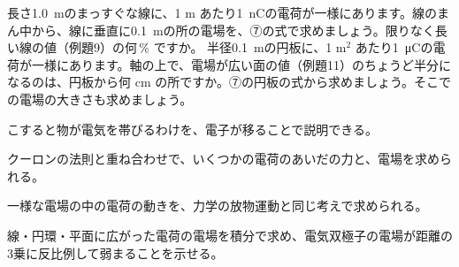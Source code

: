 \bkproblem 長さ\qty{1.0}{m}のまっすぐな線に、1 m あたり\qty{1}{nC}の電荷が一様にあります。線のまん中から、線に垂直に\qty{0.1}{m}の所の電場を、⑦の式で求めましょう。限りなく長い線の値（例題9）の何\,\% ですか。
\bkproblem 半径\qty{0.1}{m}の円板に、1 m$^2$ あたり\qty{1}{\micro C}の電荷が一様にあります。軸の上で、電場が広い面の値（例題11）のちょうど半分になるのは、円板から何 cm の所ですか。⑦の円板の式から求めましょう。そこでの電場の大きさも求めましょう。
\begin{furikaeri}
\begin{checklist}
\item こすると物が電気を帯びるわけを、電子が移ることで説明できる。
\item クーロンの法則と重ね合わせで、いくつかの電荷のあいだの力と、電場を求められる。
\item 一様な電場の中の電荷の動きを、力学の放物運動と同じ考えで求められる。
\item 線・円環・平面に広がった電荷の電場を積分で求め、電気双極子の電場が距離の3乗に反比例して弱まることを示せる。
\end{checklist}
\end{furikaeri}
